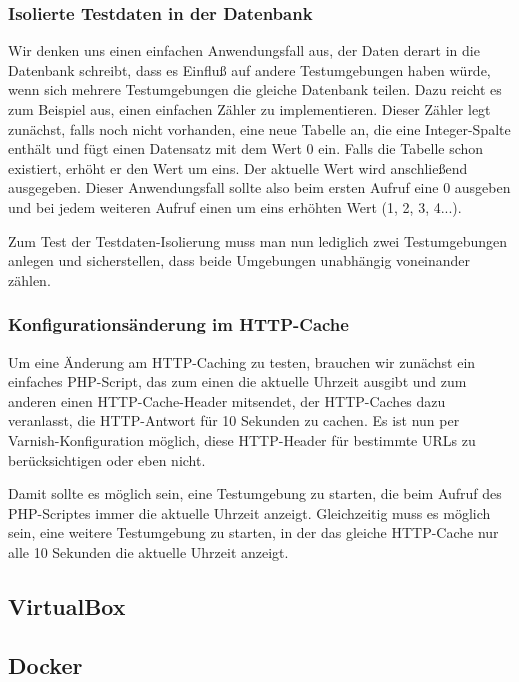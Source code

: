 \subsubsection{Isolierte Testdaten in der Datenbank}

Wir denken uns einen einfachen Anwendungsfall aus, der Daten derart in die Datenbank schreibt, dass es Einfluß auf andere Testumgebungen haben würde, wenn sich mehrere Testumgebungen die gleiche Datenbank teilen. Dazu reicht es zum Beispiel aus, einen einfachen Zähler zu implementieren. Dieser Zähler legt zunächst, falls noch nicht vorhanden, eine neue Tabelle an, die eine Integer-Spalte enthält und fügt einen Datensatz mit dem Wert 0 ein. Falls die Tabelle schon existiert, erhöht er den Wert um eins. Der aktuelle Wert wird anschließend ausgegeben. Dieser Anwendungsfall sollte also beim ersten Aufruf eine 0 ausgeben und bei jedem weiteren Aufruf einen um eins erhöhten Wert (1, 2, 3, 4...).

Zum Test der Testdaten-Isolierung muss man nun lediglich zwei Testumgebungen anlegen und sicherstellen, dass beide Umgebungen unabhängig voneinander zählen.

\subsubsection{Konfigurationsänderung im HTTP-Cache}

Um eine Änderung am HTTP-Caching zu testen, brauchen wir zunächst ein einfaches PHP-Script, das zum einen die aktuelle Uhrzeit ausgibt und zum anderen einen HTTP-Cache-Header mitsendet, der HTTP-Caches dazu veranlasst, die HTTP-Antwort für 10 Sekunden zu cachen.
Es ist nun per Varnish-Konfiguration möglich, diese HTTP-Header für bestimmte URLs zu berücksichtigen oder eben nicht.

Damit sollte es möglich sein, eine Testumgebung zu starten, die beim Aufruf des PHP-Scriptes immer die aktuelle Uhrzeit anzeigt. Gleichzeitig muss es möglich sein, eine weitere Testumgebung zu starten, in der das gleiche HTTP-Cache nur alle 10 Sekunden die aktuelle Uhrzeit anzeigt.

\subsection{VirtualBox}

\subsection{Docker}

